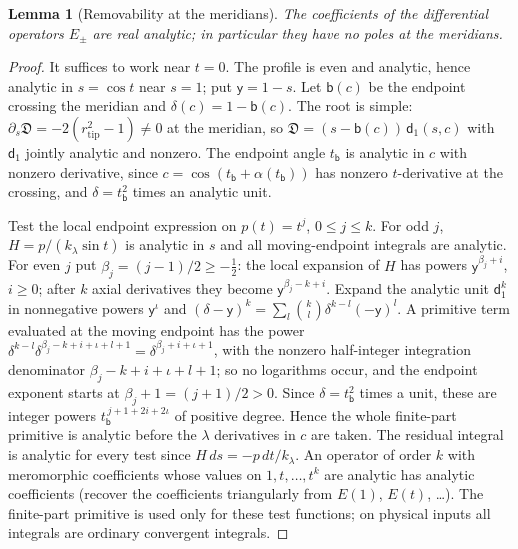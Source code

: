\documentclass[11pt]{amsart}
\numberwithin{equation}{section}
\newtheorem{lemma}[theorem]{Lemma}
\theoremstyle{definition}
\theoremstyle{remark}
\newcommand{\Disc}{\mathfrak D}
\begin{document}
\begin{lemma}[Removability at the meridians]\label{lem:meridian}
The coefficients of the differential operators $E_\pm$ are real analytic; in particular they have no poles at the meridians.
\end{lemma}

\begin{proof}
It suffices to work near $t=0$. The profile is even and analytic, hence analytic in $s=\cos t$ near $s=1$; put $\mathsf y=1-s$. Let $\mathsf b(c)$ be the endpoint crossing the meridian and $\delta(c)=1-\mathsf b(c)$. The root is simple: $\partial_s\Disc=-2(r_{\mathrm{tip}}^2-1)\ne0$ at the meridian, so $\Disc=(s-\mathsf b(c))\,\mathsf d_1(s,c)$ with $\mathsf d_1$ jointly analytic and nonzero. The endpoint angle $t_{\mathsf b}$ is analytic in $c$ with nonzero derivative, since $c=\cos(t_{\mathsf b}+\alpha(t_{\mathsf b}))$ has nonzero $t$-derivative at the crossing, and $\delta=t_{\mathsf b}^2$ times an analytic unit.

Test the local endpoint expression on $p(t)=t^j$, $0\le j\le k$. For odd $j$, $H=p/(k_\lambda\sin t)$ is analytic in $s$ and all moving-endpoint integrals are analytic. For even $j$ put $\beta_j=(j-1)/2\ge-\frac12$: the local expansion of $H$ has powers $\mathsf y^{\beta_j+i}$, $i\ge0$; after $k$ axial derivatives they become $\mathsf y^{\beta_j-k+i}$. Expand the analytic unit $\mathsf d_1^k$ in nonnegative powers $\mathsf y^{\iota}$ and $(\delta-\mathsf y)^k=\sum_l\binom kl\delta^{k-l}(-\mathsf y)^l$. A primitive term evaluated at the moving endpoint has the power $\delta^{k-l}\delta^{\beta_j-k+i+\iota+l+1}=\delta^{\beta_j+i+\iota+1}$, with the nonzero half-integer integration denominator $\beta_j-k+i+\iota+l+1$; so no logarithms occur, and the endpoint exponent starts at $\beta_j+1=(j+1)/2>0$. Since $\delta=t_{\mathsf b}^2$ times a unit, these are integer powers $t_{\mathsf b}^{\,j+1+2i+2\iota}$ of positive degree. Hence the whole finite-part primitive is analytic before the $\lambda$ derivatives in $c$ are taken. The residual integral is analytic for every test since $H\,ds=-p\,dt/k_\lambda$. An operator of order $k$ with meromorphic coefficients whose values on $1,t,\dots,t^k$ are analytic has analytic coefficients (recover the coefficients triangularly from $E(1)$, $E(t)$, \dots). The finite-part primitive is used only for these test functions; on physical inputs all integrals are ordinary convergent integrals.
\end{proof}
\end{document}
